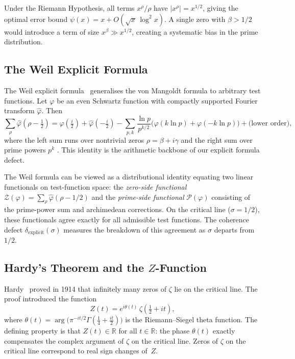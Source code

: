 \documentclass[11pt]{article}
\theoremstyle{remark}
\begin{document}
Under the Riemann Hypothesis, all terms $x^\rho/\rho$ have
$|x^\rho|=x^{1/2}$, giving the optimal error bound $\psi(x)=x+O(\sqrt{x}\,\log^2 x)$.
A single zero with $\beta>1/2$ would introduce a term of size $x^\beta \gg x^{1/2}$,
creating a systematic bias in the prime distribution.

\subsection{The Weil Explicit Formula}

The Weil explicit formula~\cite{IK} generalises the von Mangoldt formula to
arbitrary test functions.
Let $\varphi$ be an even Schwartz function with compactly supported Fourier
transform $\hat{\varphi}$.
Then
\begin{equation}\label{eq:explicit}
  \sum_{\rho}\hat{\varphi}\!\left(\rho-\tfrac{1}{2}\right)
  = \hat{\varphi}\!\left(\tfrac{i}{2}\right) + \hat{\varphi}\!\left(-\tfrac{i}{2}\right)
  - \sum_{p,k} \frac{\ln p}{p^{k/2}}
    \bigl(\varphi(k\ln p)+\varphi(-k\ln p)\bigr)
  + \text{(lower order)},
\end{equation}
where the left sum runs over nontrivial zeros $\rho=\beta+i\gamma$ and the right sum
over prime powers $p^k$ \cite{IK}.
This identity is the arithmetic backbone of our explicit formula defect.

The Weil formula can be viewed as a distributional identity equating two linear
functionals on test-function space: the \emph{zero-side functional}
$\mathcal{Z}(\varphi)=\sum_\rho\hat{\varphi}(\rho-1/2)$ and the \emph{prime-side
functional} $\mathcal{P}(\varphi)$ consisting of the prime-power sum and archimedean
corrections.
On the critical line ($\sigma=1/2$), these functionals agree exactly for all
admissible test functions.
The coherence defect $\delta_{\mathrm{explicit}}(\sigma)$ measures the breakdown
of this agreement as $\sigma$ departs from $1/2$.

\subsection{Hardy's Theorem and the $Z$-Function}

Hardy~\cite{Hardy} proved in 1914 that infinitely many zeros of $\zeta$ lie on the
critical line.
The proof introduced the function
\begin{equation}\label{eq:hardy-z}
  Z(t) = e^{i\theta(t)}\,\zeta\!\left(\tfrac{1}{2}+it\right),
\end{equation}
where $\theta(t)=\arg\!\bigl(\pi^{-it/2}\Gamma(\tfrac{1}{4}+\tfrac{it}{2})\bigr)$
is the Riemann--Siegel theta function.
The defining property is that $Z(t)\in\mathbb{R}$ for all $t\in\mathbb{R}$: the
phase $\theta(t)$ exactly compensates the complex argument of $\zeta$ on the critical
line.
Zeros of $\zeta$ on the critical line correspond to real sign changes of~$Z$.
\end{document}
